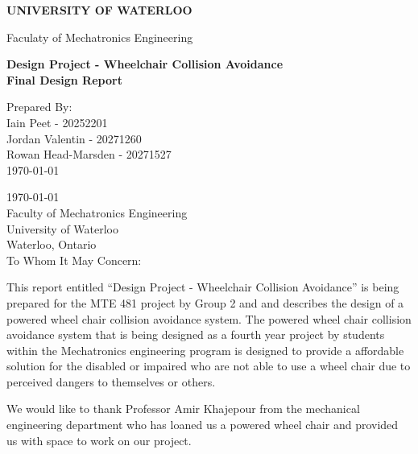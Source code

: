 \documentclass[oneside,final,a4paper]{report}
\begin{document}
\pagestyle{empty}

\begin{flushright}
 \begin{LARGE}
  \textbf{UNIVERSITY OF WATERLOO}
 \end{LARGE}

 \begin{large}
  Faculaty of Mechatronics Engineering\\[4cm]
 \end{large}

 \begin{LARGE}
  \textbf{
    Design Project - Wheelchair Collision Avoidance \\[0.0cm]
    Final Design Report
  }
 \end{LARGE}

 \vfill

  Prepared By: \\[0.2cm]
  Iain Peet - 20252201\\
  Jordan Valentin - 20271260\\
  Rowan Head-Marsden - 20271527\\
  \today
\end{flushright}
\clearpage

\today \\[0.5cm]

Faculty of Mechatronics Engineering \\
University of Waterloo \\
Waterloo, Ontario \\

To Whom It May Concern:

This report entitled “Design Project - Wheelchair Collision Avoidance” is being prepared for the MTE 481 project by Group 2 and and describes the design of a powered wheel chair collision avoidance system.  The powered wheel chair collision avoidance system that is being designed as a fourth year project by students within the Mechatronics engineering program is designed to provide a affordable solution for the disabled or impaired who are not able to use a wheel chair due to perceived dangers to themselves or others.

We would like to thank Professor Amir Khajepour from the mechanical engineering department who has loaned us a powered wheel chair and provided us with space to work on our project.  
\end{document}
